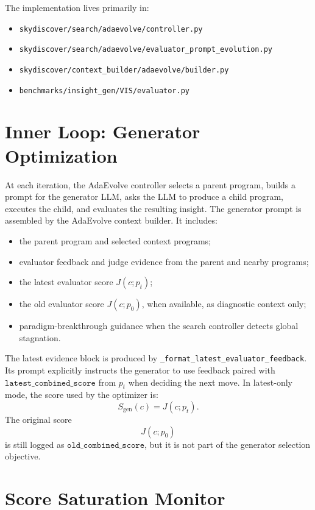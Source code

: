 \documentclass[11pt]{article}
\begin{document}
The implementation lives primarily in:
\begin{itemize}
  \item \texttt{skydiscover/search/adaevolve/controller.py}
  \item \texttt{skydiscover/search/adaevolve/evaluator\_prompt\_evolution.py}
  \item \texttt{skydiscover/context\_builder/adaevolve/builder.py}
  \item \texttt{benchmarks/insight\_gen/VIS/evaluator.py}
\end{itemize}

\section{Inner Loop: Generator Optimization}

At each iteration, the AdaEvolve controller selects a parent program, builds a
prompt for the generator LLM, asks the LLM to produce a child program, executes
the child, and evaluates the resulting insight. The generator prompt is assembled
by the AdaEvolve context builder. It includes:

\begin{itemize}
  \item the parent program and selected context programs;
  \item evaluator feedback and judge evidence from the parent and nearby programs;
  \item the latest evaluator score \(J(c; p_t)\);
  \item the old evaluator score \(J(c; p_0)\), when available, as diagnostic
        context only;
  \item paradigm-breakthrough guidance when the search controller detects global
        stagnation.
\end{itemize}

The latest evidence block is produced by
\texttt{\_format\_latest\_evaluator\_feedback}. Its prompt explicitly instructs
the generator to use feedback paired with \(\texttt{latest\_combined\_score}\)
from \(p_t\) when deciding the next move. In latest-only mode, the score used by
the optimizer is:
\[
  S_{\mathrm{gen}}(c) = J(c; p_t).
\]
The original score
\[
  J(c; p_0)
\]
is still logged as \(\texttt{old\_combined\_score}\), but it is not part of the
generator selection objective.

\section{Score Saturation Monitor}
\end{document}
